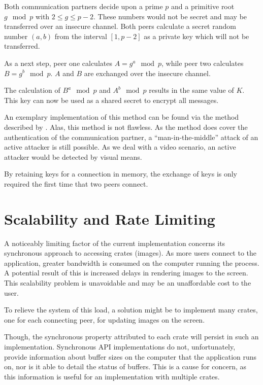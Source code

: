 \documentclass[10pt, a4paper]{article}
\begin{document}
Both communication partners decide upon a prime $p$ and a primitive root $g \mod p$ with $2 \le g \le p-2$.
These numbers would not be secret and may be transferred over an insecure channel.
Both peers calculate a secret random number $(a, b)$ from the interval $[1, p-2]$ as a private key which will not be transferred.

As a next step, peer one calculates $A = g^a \mod p$, while peer two calculates $B = g^b \mod p$.
$A$ and $B$ are exchanged over the insecure channel.

The calculation of $B^a \mod p$ and $A^b \mod p$ results in the same value of $K$.
This key can now be used as a shared secret to encrypt all messages.

An exemplary implementation of this method can be found via the method described by \cite{newdirections}.
Alas, this method is not flawless.
As the method does cover the authentication of the communication partner, a ``man-in-the-middle'' attack of an active attacker is still possible.
As we deal with a video scenario, an active attacker would be detected by visual means.

By retaining keys for a connection in memory, the exchange of keys is only required the first time that two peers connect.

\section{Scalability and Rate Limiting}

A noticeably limiting factor of the current implementation concerns its synchronous approach to accessing crates (images).
As more users connect to the application, greater bandwidth is consumed on the computer running the process.
A potential result of this is increased delays in rendering images to the screen.
This scalability problem is unavoidable and may be an unaffordable cost to the user.

To relieve the system of this load, a solution might be to implement many crates, one for each connecting peer, for updating images on the screen.

Though, the synchronous property attributed to each crate will persist in such an implementation.
Synchronous API implementations do not, unfortunately, provide information about buffer sizes on the computer that the application runs on, nor is it able to detail the status of buffers.
This is a cause for concern, as this information is useful for an implementation with multiple crates.
\end{document}
